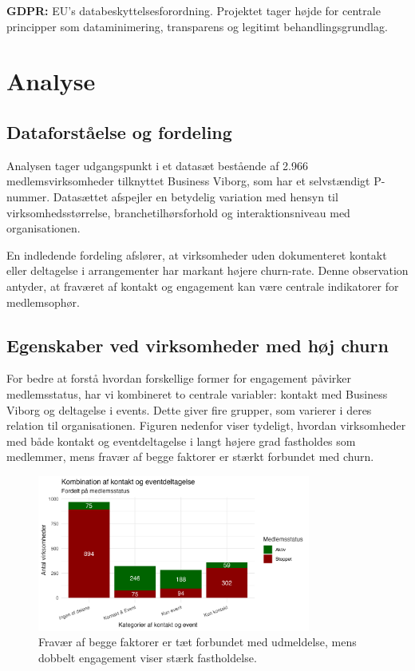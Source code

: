\documentclass[
  11pt,
  letterpaper,
  DIV=11,
  numbers=noendperiod]{scrartcl}
\begin{document}
\textbf{GDPR:} EU's databeskyttelsesforordning. Projektet tager højde
for centrale principper som dataminimering, transparens og legitimt
behandlingsgrundlag.

\section{Analyse}\label{analyse}

\subsection{Dataforståelse og
fordeling}\label{dataforstuxe5else-og-fordeling}

Analysen tager udgangspunkt i et datasæt bestående af 2.966
medlemsvirksomheder tilknyttet Business Viborg, som har et selvstændigt
P-nummer. Datasættet afspejler en betydelig variation med hensyn til
virksomhedsstørrelse, branchetilhørsforhold og interaktionsniveau med
organisationen.

En indledende fordeling afslører, at virksomheder uden dokumenteret
kontakt eller deltagelse i arrangementer har markant højere churn-rate.
Denne observation antyder, at fraværet af kontakt og engagement kan være
centrale indikatorer for medlemsophør.

\subsection{Egenskaber ved virksomheder med høj
churn}\label{egenskaber-ved-virksomheder-med-huxf8j-churn}

For bedre at forstå hvordan forskellige former for engagement påvirker
medlemsstatus, har vi kombineret to centrale variabler: kontakt med
Business Viborg og deltagelse i events. Dette giver fire grupper, som
varierer i deres relation til organisationen. Figuren nedenfor viser
tydeligt, hvordan virksomheder med både kontakt og eventdeltagelse i
langt højere grad fastholdes som medlemmer, mens fravær af begge
faktorer er stærkt forbundet med churn.

\begin{figure}[H]

{\centering \includegraphics[width=0.8\textwidth,height=\textheight]{images/EDA_3_kombination_kontakt_event.png}

}

\caption{Fravær af begge faktorer er tæt forbundet med udmeldelse, mens
dobbelt engagement viser stærk fastholdelse.}

\end{figure}%
\end{document}
